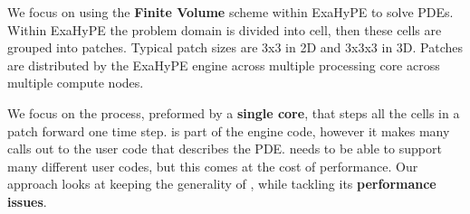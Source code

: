We focus on using the \textbf{Finite Volume} scheme within ExaHyPE to solve PDEs.
Within ExaHyPE the problem domain is divided into cell, then these cells are grouped into patches.
Typical patch sizes are 3x3 in 2D and 3x3x3 in 3D.
Patches are distributed by the ExaHyPE engine across multiple processing core across multiple compute nodes.

We focus on the  process, preformed by a \textbf{single core}, that steps all the cells in a patch forward one time step.
 is part of the engine code, however it makes many calls out to the user code that describes the PDE.
 needs to be able to support many different user codes, but this comes at the cost of performance.
Our approach looks at keeping the generality of , while tackling its \textbf{performance issues}.  